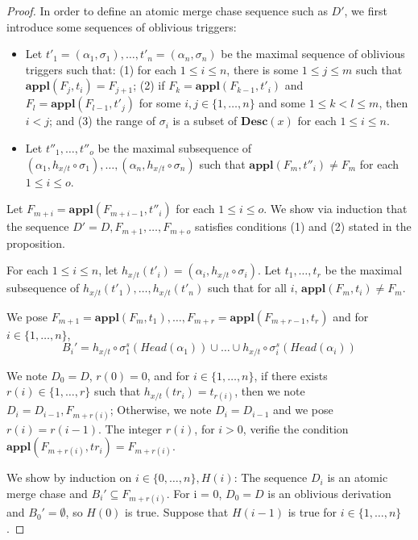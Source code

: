 \documentclass{article}
\theoremstyle{definition}
\theoremstyle{remark}
\newcommand{\Appl}{\textbf{appl}}
\newcommand{\des}{\textbf{Desc}}
\begin{document}
\begin{proof}
In order to define an atomic merge chase sequence such as $D'$, we first introduce some sequences of oblivious triggers:
\begin{itemize}
\item Let $t'_1 = (\alpha_1,\sigma_1),\ldots, t'_n =(\alpha_n,\sigma_n)$ be the maximal sequence of oblivious triggers such that:
(1) for each $1 \leq i \leq n$, there is some $1 \leq j \leq m$ such that $\Appl(F_j, t_i) = F_{j+1}$;
(2) if $F_k = \Appl(F_{k-1}, t'_i)$ and $F_l = \Appl(F_{l-1},t'_j)$ for some $i, j \in \{1, \ldots, n\}$ and  some $1 \leq k < l \leq m$, then $i<j$; and (3) the range of $\sigma_i$ is a subset of $\des(x)$ for each $1 \leq i \leq n$.
\item Let $t''_1, \ldots, t''_o$ be the maximal subsequence of $(\alpha_1, h_{x/t} \circ \sigma_1), \ldots, (\alpha_n, h_{x/t} \circ \sigma_n)$ such that $\Appl(F_{m}, t''_i) \neq F_{m}$ for each $1 \leq i \leq o$.
\end{itemize}
Let $F_{m+i} = \Appl(F_{m+i-1}, t''_i)$ for each $1 \leq i \leq o$.
We show via induction that the sequence $D' = D, F_{m+1}, \ldots, F_{m+o}$ satisfies conditions (1) and (2) stated in the proposition.


For each $1 \leq i \leq n$, let $h_{x/t}(t'_i) = (\alpha_i, h_{x/t} \circ \sigma_i)$.
Let $t_1, \ldots, t_r$ be the maximal subsequence of $h_{x/t}(t'_1), \ldots, h_{x/t}(t'_n)$ such that for all $i$, $\Appl(F_{m}, t_i) \neq F_{m}$.


We pose $F_{m+1} = \Appl(F_m,t_1),\ldots, F_{m+r} = \Appl(F_{m+r-1},t_r)$ and for $i \in \{1,\ldots,n\}$, $$B_i' = {h_{x/t} \circ \sigma_1^s}(Head(\alpha_1)) \cup \ldots \cup {h_{x/t} \circ \sigma^s_i}(Head(\alpha_{i}))$$

We note $D_0 = D$, $r(0) = 0$, and for $i \in \{1,\ldots,n\}$, if there exists $r(i) \in \{1,\ldots,r\}$ such that $h_{x/t}(tr_i) = t_{r(i)}$, then we note $D_i = D_{i-1},F_{m+r(i)}$; Otherwise, we note $D_i = D_{i-1}$ and we pose $r(i) = r(i-1)$. The integer $r(i)$, for $i >0$, verifie the condition $\Appl(F_{m+r(i)},tr_i) =  F_{m+r(i)}$.

We show by induction on $i \in \{0,\ldots, n\},H(i)$: The sequence $D_i$ is an atomic merge chase and $B_i' \subseteq F_{m+r(i)}$. For i = 0, $D_0 = D$ is an oblivious derivation and $B_0' = \emptyset$, so $H(0)$ is true. Suppose that $H(i-1)$ is true for $i \in \{1,\ldots,n\}$.


\end{proof}
\end{document}
